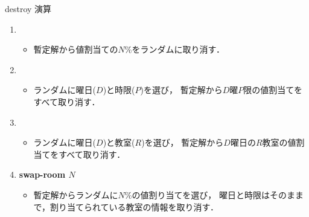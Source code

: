 \documentclass[11pt,dvipdfmx]{beamer}
\begin{document}
\begin{frame}{destroy 演算}

  \begin{block}{}
    \begin{enumerate}
    \item {}
      \begin{itemize}
      \item 暫定解から値割当ての$N$\%をランダムに取り消す．
      \end{itemize}
    \item {}
      \begin{itemize}
      \item ランダムに曜日($D$)と時限($P$)を選び，
        暫定解から$D$曜$P$限の値割当てをすべて取り消す．
   \end{itemize}
  \item {}
   \begin{itemize}
   \item ランダムに曜日($D$)と教室($R$)を選び，
     暫定解から$D$曜日の$R$教室の値割当てをすべて取り消す．
   \end{itemize}
  \item \alert{\bf swap-room $N$}
   \begin{itemize}
    \item 暫定解からランダムに$N$\%の値割り当てを選び，
    曜日と時限はそのままで，割り当てられている教室の情報を取り消す．
   \end{itemize}
  \end{enumerate}
  \end{block}
 \end{frame}
\end{document}
